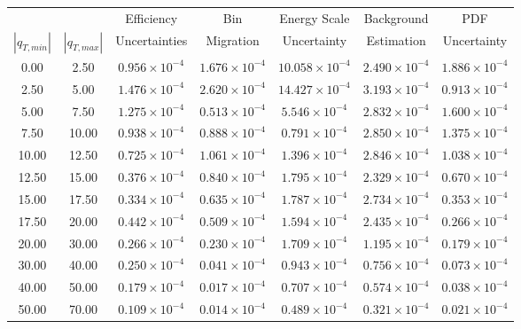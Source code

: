 \begin{tabular}{|c|c||c|c|c|c|c|}\hline
            &             & Efficiency &   Bin     & Energy Scale  & Background & PDF\\ 
$|q_{T,min}|$ & $|q_{T,max}|$ & Uncertainties & Migration & Uncertainty & Estimation & Uncertainty \\ \hline 
    0.00 &    2.50 & $0.956 \times 10^{-4}$ &  $1.676 \times 10^{-4}$ & $10.058 \times 10^{-4}$ & $2.490 \times 10^{-4}$ & $1.886 \times 10^{-4}$ \\ 
    2.50 &    5.00 & $1.476 \times 10^{-4}$ &  $2.620 \times 10^{-4}$ & $14.427 \times 10^{-4}$ & $3.193 \times 10^{-4}$ & $0.913 \times 10^{-4}$ \\ 
    5.00 &    7.50 & $1.275 \times 10^{-4}$ &  $0.513 \times 10^{-4}$ & $5.546 \times 10^{-4}$ & $2.832 \times 10^{-4}$ & $1.600 \times 10^{-4}$ \\ 
    7.50 &   10.00 & $0.938 \times 10^{-4}$ &  $0.888 \times 10^{-4}$ & $0.791 \times 10^{-4}$ & $2.850 \times 10^{-4}$ & $1.375 \times 10^{-4}$ \\ 
   10.00 &   12.50 & $0.725 \times 10^{-4}$ &  $1.061 \times 10^{-4}$ & $1.396 \times 10^{-4}$ & $2.846 \times 10^{-4}$ & $1.038 \times 10^{-4}$ \\ 
   12.50 &   15.00 & $0.376 \times 10^{-4}$ &  $0.840 \times 10^{-4}$ & $1.795 \times 10^{-4}$ & $2.329 \times 10^{-4}$ & $0.670 \times 10^{-4}$ \\ 
   15.00 &   17.50 & $0.334 \times 10^{-4}$ &  $0.635 \times 10^{-4}$ & $1.787 \times 10^{-4}$ & $2.734 \times 10^{-4}$ & $0.353 \times 10^{-4}$ \\ 
   17.50 &   20.00 & $0.442 \times 10^{-4}$ &  $0.509 \times 10^{-4}$ & $1.594 \times 10^{-4}$ & $2.435 \times 10^{-4}$ & $0.266 \times 10^{-4}$ \\ 
   20.00 &   30.00 & $0.266 \times 10^{-4}$ &  $0.230 \times 10^{-4}$ & $1.709 \times 10^{-4}$ & $1.195 \times 10^{-4}$ & $0.179 \times 10^{-4}$ \\ 
   30.00 &   40.00 & $0.250 \times 10^{-4}$ &  $0.041 \times 10^{-4}$ & $0.943 \times 10^{-4}$ & $0.756 \times 10^{-4}$ & $0.073 \times 10^{-4}$ \\ 
   40.00 &   50.00 & $0.179 \times 10^{-4}$ &  $0.017 \times 10^{-4}$ & $0.707 \times 10^{-4}$ & $0.574 \times 10^{-4}$ & $0.038 \times 10^{-4}$ \\ 
   50.00 &   70.00 & $0.109 \times 10^{-4}$ &  $0.014 \times 10^{-4}$ & $0.489 \times 10^{-4}$ & $0.321 \times 10^{-4}$ & $0.021 \times 10^{-4}$ \\ 

\end{tabular}
